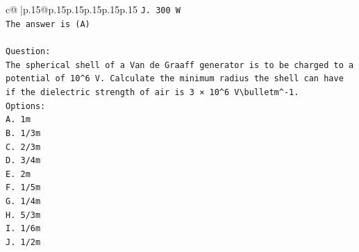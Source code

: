 \documentclass{article}
\begin{document}
{\begin{supertabular}{c@{$\;$}|p{.15\linewidth}@{}p{.15\linewidth}p{.15\linewidth}p{.15\linewidth}p{.15\linewidth}p{.15\linewidth}}
{{{\texttt{J. 300 W} \\
\texttt{The answer is (A)} \\
\\ 
\texttt{Question:} \\
\texttt{The spherical shell of a Van de Graaff generator is to be charged to a potential of 10\^{}6 V. Calculate the minimum radius the shell can have if the dielectric strength of air is 3 × 10\^{}6 V\textbackslash{}bulletm\^{}{-}1.} \\
\texttt{Options:} \\
\texttt{A. 1m} \\
\texttt{B. 1/3m} \\
\texttt{C. 2/3m} \\
\texttt{D. 3/4m} \\
\texttt{E. 2m} \\
\texttt{F. 1/5m} \\
\texttt{G. 1/4m} \\
\texttt{H. 5/3m} \\
\texttt{I. 1/6m} \\
\texttt{J. 1/2m} \\
            }
        }
    }
     \\ \\


\end{supertabular}}
\end{document}
